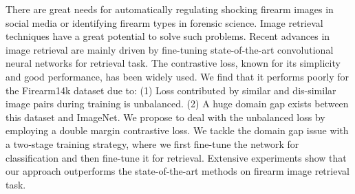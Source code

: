 \begin{enumerate}
There are great needs for automatically regulating shocking firearm images in social media or identifying firearm types in forensic science. Image retrieval techniques have a great potential to solve such problems. Recent advances in image retrieval are mainly driven by fine-tuning state-of-the-art convolutional neural networks for retrieval task. The contrastive loss, known for its simplicity and good performance, has been widely used. We find that it performs poorly for the Firearm14k dataset due to: (1) Loss contributed by similar and dis-similar image pairs during training is unbalanced. (2) A huge domain gap exists between this dataset and ImageNet. We propose to deal with the unbalanced loss by employing a double margin contrastive loss. We tackle the domain gap issue with a two-stage training strategy, where we first fine-tune the network for classification and then fine-tune it for retrieval. Extensive experiments show that our approach outperforms the state-of-the-art methods on firearm image retrieval task.

\end{enumerate}

